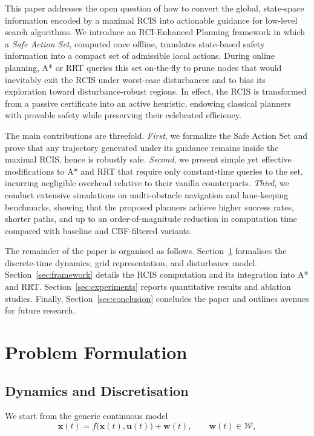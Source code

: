 \documentclass[conference]{IEEEtran}
\begin{document}
This paper addresses the open question of how to convert the global, state-space information encoded by a maximal RCIS into actionable guidance for low-level search algorithms.  We introduce an RCI-Enhanced Planning framework in which a \emph{Safe Action Set}, computed once offline, translates state-based safety information into a compact set of admissible local actions.  During online planning, A* or RRT queries this set on-the-fly to prune nodes that would inevitably exit the RCIS under worst-case disturbances and to bias its exploration toward disturbance-robust regions.  In effect, the RCIS is transformed from a passive certificate into an active heuristic, endowing classical planners with provable safety while preserving their celebrated efficiency.

The main contributions are threefold.  \emph{First}, we formalize the Safe Action Set and prove that any trajectory generated under its guidance remains inside the maximal RCIS, hence is robustly safe.  \emph{Second}, we present simple yet effective modifications to A* and RRT that require only constant-time queries to the set, incurring negligible overhead relative to their vanilla counterparts.  \emph{Third}, we conduct extensive simulations on multi-obstacle navigation and lane-keeping benchmarks, showing that the proposed planners achieve higher success rates, shorter paths, and up to an order-of-magnitude reduction in computation time compared with baseline and CBF-filtered variants.

The remainder of the paper is organised as follows.  Section~\ref{sec:problem} formalises the discrete-time dynamics, grid representation, and disturbance model.  Section~\ref{sec:framework} details the RCIS computation and its integration into A* and RRT.  Section~\ref{sec:experiments} reports quantitative results and ablation studies.  Finally, Section~\ref{sec:conclusion} concludes the paper and outlines avenues for future research.

\section{Problem Formulation}\label{sec:problem}

\subsection{Dynamics and Discretisation}

We start from the generic continuous model
\begin{equation}
\dot{\mathbf x}(t)=f\!\bigl(\mathbf x(t),\mathbf u(t)\bigr)+\mathbf w(t),
\qquad
\mathbf w(t)\in\mathcal W ,
\label{eq:generic_continuous}
\end{equation}
\end{document}
